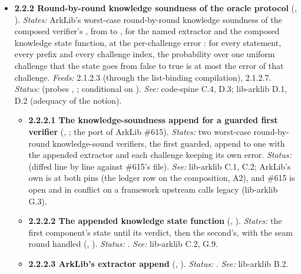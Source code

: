 \begin{itemize}[label={}, leftmargin=1.3em, itemindent=-1.3em, labelwidth=0pt, labelsep=0pt, itemsep=4pt, topsep=3pt]
\begin{itemize}[label={}, leftmargin=1.3em, itemindent=-1.3em, labelwidth=0pt, labelsep=0pt, itemsep=4pt, topsep=3pt]
\end{itemize}
\item {}\label{obl:node-2.2.2}\textbf{2.2.2 Round-by-round knowledge soundness of the oracle protocol} (, ). \emph{States:} ArkLib's worst-case round-by-round knowledge soundness of the composed verifier's , from  to , for the named extractor  and the composed knowledge state function, at the per-challenge error : for every statement, every prefix and every challenge index, the probability over one uniform challenge that the state goes from false to true is at most the error of that challenge. \emph{Feeds:} 2.1.2.3 (through the list-binding compilation), 2.1.2.7. \emph{Status:}  (probes , ; conditional on ). \emph{See:} code-spine C.4, D.3; lib-arklib D.1, D.2 (adequacy of the notion).
\begin{itemize}[label={}, leftmargin=1.3em, itemindent=-1.3em, labelwidth=0pt, labelsep=0pt, itemsep=4pt, topsep=3pt]
\item {}\label{obl:node-2.2.2.1}\textbf{2.2.2.1 The knowledge-soundness append for a guarded first verifier} (, ; the port of ArkLib \#615). \emph{States:} two worst-case round-by-round knowledge-sound verifiers, the first guarded, append to one with the appended extractor and each challenge keeping its own error. \emph{Status:}  (diffed line by line against \#615's file). \emph{See:} lib-arklib C.1, C.2; ArkLib's own  is  at both pins (the ledger row on the composition, A2), and \#615 is open and in conflict on a framework upstream calls legacy (lib-arklib G.3).
\item {}\label{obl:node-2.2.2.2}\textbf{2.2.2.2 The appended knowledge state function} (, ). \emph{States:} the first component's state until its verdict, then the second's, with the seam round handled (, ). \emph{Status:} . \emph{See:} lib-arklib C.2, G.9.
\item {}\label{obl:node-2.2.2.3}\textbf{2.2.2.3 ArkLib's extractor append} (, ). \emph{Status:} . \emph{See:} lib-arklib B.2.

\end{itemize}
\end{itemize}
